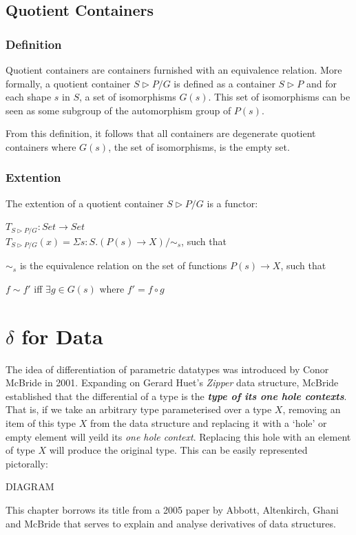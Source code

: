 \documentclass[12pt]{report}
\begin{document}
\section{Quotient Containers}
\subsection{Definition}
Quotient containers are containers furnished with an equivalence relation. More formally, a quotient container $S \rhd P/G$ is defined as a container $S \rhd P$ and for each shape $s$ in $S$, a set of isomorphisms $G(s)$. This set of isomorphisms can be seen as some subgroup of the automorphism group of $P(s)$.

 From this definition, it follows that all containers are degenerate quotient containers where $G(s)$, the set of isomorphisms, is the empty set. 

\subsection{Extention}
The extention of a quotient container $S \rhd P/G$ is a functor:
\begin{center}
$T_{S \rhd P/G} : Set \rightarrow Set$\\
$T_{S \rhd P/G}(x) = \Sigma s:S.(P(s) \rightarrow X)/\sim_{s}$, such that\\
\end{center}
$\sim_{s}$ is the equivalence relation on the set of functions $P(s) \rightarrow X$, such that
\begin{center}
$f \sim f'$ iff $\exists g \in G(s)$ where $f' = f \circ g$
\end{center}

\chapter{$\delta$ for Data}
The idea of differentiation of parametric datatypes was introduced by Conor McBride in 2001. Expanding on Gerard Huet's \textit{Zipper} data structure\cite{zipper}, McBride established that the differential of a type is the \textbf{\textit{type of its one hole contexts}}. That is, if we take an arbitrary type parameterised over a type $X$, removing an item of this type $X$ from the data structure and replacing it with a `hole' or empty element will yeild its \textit{one hole context}. Replacing this hole with an element of type $X$ will produce the original type. This can be easily represented pictorally:
\begin{center}
DIAGRAM
\end{center} 
This chapter borrows its title from a 2005 paper by Abbott, Altenkirch, Ghani and McBride that serves to explain and analyse derivatives of data structures.
\end{document}
